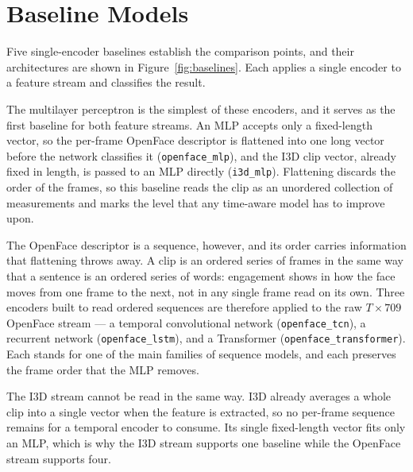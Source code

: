 \documentclass[../main.tex]{subfiles}
\begin{document}
\FloatBarrier
\section{Baseline Models}
\label{sec:baselines}

Five single-encoder baselines establish the comparison points, and their architectures are shown in Figure~\ref{fig:baselines}. Each applies a single encoder to a feature stream and classifies the result.

The multilayer perceptron is the simplest of these encoders, and it serves as the first baseline for both feature streams. An MLP accepts only a fixed-length vector, so the per-frame OpenFace descriptor is flattened into one long vector before the network classifies it (\texttt{openface\_mlp}), and the I3D clip vector, already fixed in length, is passed to an MLP directly (\texttt{i3d\_mlp}). Flattening discards the order of the frames, so this baseline reads the clip as an unordered collection of measurements and marks the level that any time-aware model has to improve upon.

The OpenFace descriptor is a sequence, however, and its order carries information that flattening throws away. A clip is an ordered series of frames in the same way that a sentence is an ordered series of words: engagement shows in how the face moves from one frame to the next, not in any single frame read on its own. Three encoders built to read ordered sequences are therefore applied to the raw $T\times709$ OpenFace stream --- a temporal convolutional network (\texttt{openface\_tcn}), a recurrent network (\texttt{openface\_lstm}), and a Transformer (\texttt{openface\_transformer}). Each stands for one of the main families of sequence models, and each preserves the frame order that the MLP removes.

The I3D stream cannot be read in the same way. I3D already averages a whole clip into a single vector when the feature is extracted, so no per-frame sequence remains for a temporal encoder to consume. Its single fixed-length vector fits only an MLP, which is why the I3D stream supports one baseline while the OpenFace stream supports four.
\end{document}
